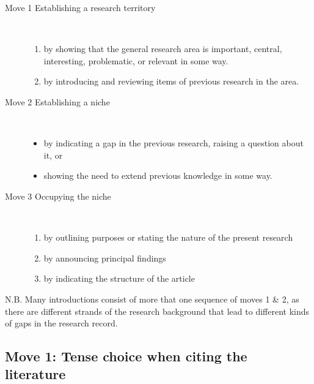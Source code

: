 \begin{description}
	\item[Move 1 Establishing a research territory] \hfill \\
	\begin{enumerate} 
		\item by showing that the general research area is important, central, interesting, problematic, or relevant in some way.
		\item by introducing and reviewing items of previous research in the area.
	\end{enumerate}
	\item[Move 2 Establishing a niche] \hfill \\
		\begin{itemize}
			\item by indicating a gap in the previous research, raising a question about it, or
			\item showing the need to extend previous knowledge in some way.
		\end{itemize}
	\item[Move 3 Occupying the niche] \hfill \\
	\begin{enumerate}
		\item by outlining purposes or stating the nature of the present research
		\item by announcing principal findings
		\item by indicating the structure of the article
	\end{enumerate}
\end{description}

N.B. Many introductions consist of more that one sequence of moves 1 \& 2, as there are different strands of the research background that lead to different kinds of gaps in the research record. 

\subsection{Move 1: Tense choice when citing the literature}\label{tenseChoice}
	
